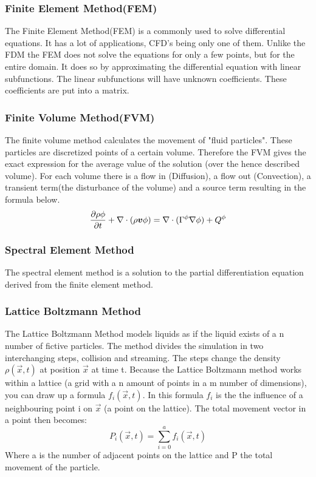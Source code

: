 \documentclass{article}
\begin{document}
\subsubsection{Finite Element Method(FEM)}
The Finite Element Method(FEM) is a commonly used to solve differential equations. It has a lot of applications, CFD's being only one of them. Unlike the FDM the FEM does not solve the equations for only a few points, but for the entire domain. It does so by approximating the differential equation with linear subfunctions. The linear subfunctions will have unknown coefficients. These coefficients are put into a matrix.
\subsubsection{Finite Volume Method(FVM)}
The finite volume method calculates the movement of "fluid particles". These particles are discretized points of a certain volume.\cite{Finite Volume} Therefore the FVM gives the exact expression for the average value of the solution (over the hence described volume). For each volume there is a flow in (Diffusion), a flow out (Convection), a transient term(the disturbance of the volume) and a source term resulting in the formula below.
\[\pdv{\rho\phi}{t} + \nabla \cdot (\rho\boldsymbol{v}\phi) = \nabla \cdot (\Gamma^\phi\nabla\phi) + Q^\phi\]
\subsubsection{Spectral Element Method}
The spectral element method is a solution to the partial differentiation equation derived from the finite element method.
\subsubsection{Lattice Boltzmann Method}
The Lattice Boltzmann Method models liquids as if the liquid exists of a n number of fictive particles. The method divides the simulation in two interchanging steps, collision and streaming. The steps change the density $\rho{(\vec{x},t)}$ at position $\vec{x}$ at time t. Because the Lattice Boltzmann method works within a lattice (a grid with a n amount of points in a m number of dimensions), you can draw up a formula $f_{i}(\vec{x},t)$. In this formula $f_{i}$ is the the influence of a neighbouring point i on $\vec{x}$ (a point on the lattice). The total movement vector in a point then becomes: \[P_{i}(\vec{x},t) = \sum_{i=0}^{a}f_{i}(\vec{x},t)\] Where a is the number of adjacent points on the lattice and P the total movement of the particle.
\end{document}

